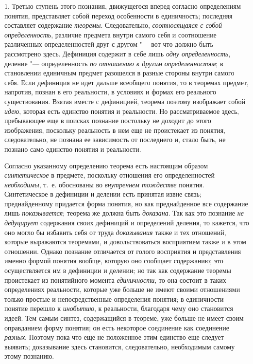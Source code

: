 {{1. Третью ступень этого познания, движущегося вперед согласно
определениям понятия, представляет собой переход особенности в единичность;
последняя составляет содержание
{\em теоремы}.
Следовательно,
{\em соотносящаяся с собой
определенность}, различие предмета внутри самого себя и
соотношение различенных определенностей друг с другом "--- вот
что должно быть рассмотрено здесь. Дефиниция содержит в себе лишь
{\em одну определенность},
деление "--- определенность
{\em по отношению к другим
определенностям}; в становлении единичным предмет разошелся
в разные стороны внутри самого себя. Если дефиниция не идет дальше
всеобщего понятия, то в теоремах предмет, напротив, познан в его
реальности, в условиях и формах его реального существования. Взятая вместе
с дефиницией, теорема поэтому изображает собой
{\em идею}, которая есть
единство понятия и реальности. Но рассматриваемое здесь, пребывающее еще в
поисках познание постольку не доходит до этого изображения, поскольку
реальность в нем еще не проистекает из понятия, следовательно, не познана
ее зависимость от последнего и, стало быть, не познано само единство
понятия и реальности.

Согласно указанному определению теорема есть настоящим образом
{\em синтетическое} в
предмете, поскольку отношения его определенностей
{\em необходимы}, т.~е.
обоснованы во {\em внутреннем
тождестве} понятия. Синтетическое в дефиниции и делении есть
принятая извне связь; преднайденному придается форма понятия, но как
преднайденное все содержание лишь
{\em показывается};
теорема же должна быть
{\em доказана}. Так как
это познание {\em не дедуцирует}
содержания своих дефиниций и определений деления, то кажется,
что оно могло бы избавить себя от труда
{\em доказывания} также и
тех отношений, которые выражаются теоремами, и довольствоваться восприятием
также и в этом отношении. Однако познание отличается от голого восприятия и
представления именно формой понятия вообще, которую оно сообщает
содержанию; это осуществляется им в дефиниции и делении; но так как
содержание теоремы проистекает из понятийного момента
{\em единичности}, то она
состоит в таких определениях реальности, которые уже больше не имеют своими
отношениями только простые и непосредственные определения понятия; в
единичности понятие перешло к
{\em инобытию}, к
реальности, благодаря чему оно становится идеей. Тем самым синтез,
содержащийся в теореме, уже больше не имеет своим оправданием форму
понятия; он есть некоторое соединение как соединение
{\em разных}. Поэтому
пока что еще не положенное этим единство еще следует выявить; доказывание
здесь становится, следовательно, необходимым самому этому познанию.

}}
